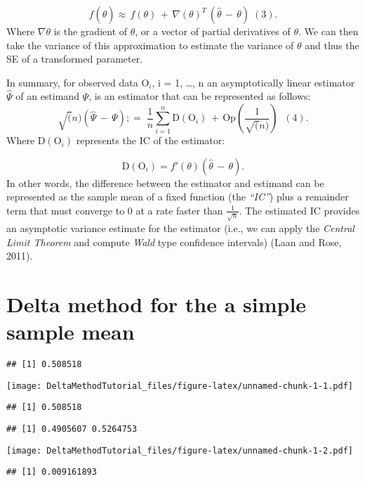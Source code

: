 \documentclass[]{article}
\begin{document}
\[f(\hat\theta) \approx\, f(\theta) \,+\,\nabla(\theta)^T\,(\hat\theta\,-\,\theta)\; (3).\]
Where \(\nabla \theta\) is the gradient of \(\theta\), or a vector of
partial derivatives of \(\theta\). We can then take the variance of this
approximation to estimate the variance of \(\theta\) and thus the SE of
a transformed parameter.

In summary, for observed data \(\text{O}_i\), i = 1, \ldots, n an
asymptotically linear estimator \(\hat\Psi\) of an estimand \(\Psi\), is
an estimator that can be represented as follows:
\[\sqrt(n)(\hat\Psi\,-\,\Psi);=\;\frac{1}{n}\sum_{i=1}^n \text{D}(\text{O}_{i})\,+\,\text{Op}(\frac{1}{\sqrt(n)})\;\;(4).\]
Where \(\text{D}(\text{O}_{i})\) represents the IC of the estimator:

\[\text{D}(\text{O}_{i})=f'(\theta)(\hat\theta\,-\,\theta).\] In other
words, the difference between the estimator and estimand can be
represented as the sample mean of a fixed function (the \emph{``IC''})
plus a remainder term that must converge to 0 at a rate faster than
\(\frac{1}{\sqrt{n}}\). The estimated IC provides an asymptotic variance
estimate for the estimator (i.e., we can apply the \emph{Central Limit
Theorem} and compute \emph{Wald} type confidence intervals) (Laan and
Rose, 2011).

\hypertarget{delta-method-for-the-a-simple-sample-mean}{%
\section{Delta method for the a simple sample
mean}\label{delta-method-for-the-a-simple-sample-mean}}

\begin{verbatim}
## [1] 0.508518
\end{verbatim}

\texttt{[image: DeltaMethodTutorial\_files/figure-latex/unnamed-chunk-1-1.pdf]}

\begin{verbatim}
## [1] 0.508518
\end{verbatim}

\begin{verbatim}
## [1] 0.4905607 0.5264753
\end{verbatim}

\texttt{[image: DeltaMethodTutorial\_files/figure-latex/unnamed-chunk-1-2.pdf]}

\begin{verbatim}
## [1] 0.009161893
\end{verbatim}
\end{document}
